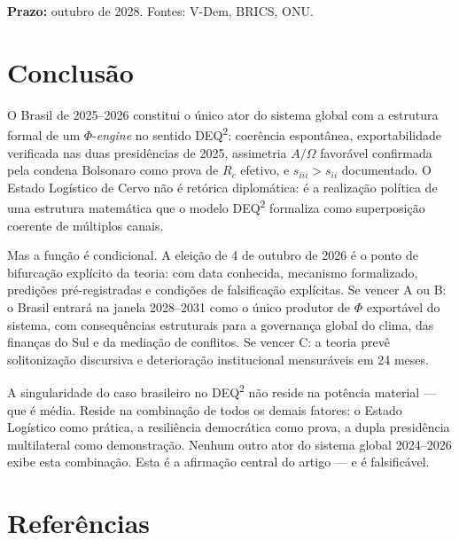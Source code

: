 \documentclass[12pt]{article}
\theoremstyle{definition}
\theoremstyle{remark}
\begin{document}
\textbf{Prazo:} outubro de 2028. Fontes: V-Dem, BRICS, ONU.

\section{Conclus\~{a}o}

O Brasil de 2025--2026 constitui o \'{u}nico ator do sistema global com a estrutura formal de um \(\Phi\)-\textit{engine} no sentido DEQ\textsuperscript{2}: coer\^{e}ncia espont\^{a}nea, exportabilidade verificada nas duas presi\-d\^{e}ncias de 2025, assimetria \(A/\Omega\) favor\'{a}vel confirmada pela condena Bolsonaro como prova de \(R_c\) efetivo, e \(s_{iii} > s_{ii}\) documentado. O Estado Log\'{i}stico de Cervo n\~{a}o \'{e} retórica diplom\'{a}tica: \'{e} a realiza\c{c}\~{a}o pol\'{i}tica de uma estrutura matem\'{a}tica que o modelo DEQ\textsuperscript{2} formaliza como superposi\c{c}\~{a}o coerente de m\'{u}ltiplos canais.

Mas a fun\c{c}\~{a}o \'{e} condicional. A elei\c{c}\~{a}o de 4 de outubro de 2026 \'{e} o ponto de bifurca\c{c}\~{a}o expl\'{i}cito da teoria: com data conhecida, mecanismo formalizado, predi\c{c}\~{o}es pr\'{e}-registradas e condi\c{c}\~{o}es de falsifica\c{c}\~{a}o expl\'{i}citas. Se vencer A ou B: o Brasil entrar\'{a} na janela 2028--2031 como o \'{u}nico produtor de \(\Phi\) export\'{a}vel do sistema, com consequ\^{e}ncias estruturais para a governan\c{c}a global do clima, das finan\c{c}as do Sul e da mediação de conflitos. Se vencer C: a teoria prevê solitoniza\c{c}\~{a}o discursiva e deteriora\c{c}\~{a}o institucional mensur\'{a}veis em 24 meses.

A singularidade do caso brasileiro no DEQ\textsuperscript{2} n\~{a}o reside na pot\^{e}ncia material --- que \'{e} m\'{e}dia. Reside na combina\c{c}\~{a}o de todos os demais fatores: o Estado Log\'{i}stico como pr\'{a}tica, a resili\^{e}ncia democr\'{a}tica como prova, a dupla presid\^{e}ncia multilateral como demonstra\c{c}\~{a}o. Nenhum outro ator do sistema global 2024--2026 exibe esta combina\c{c}\~{a}o. Esta \'{e} a afirma\c{c}\~{a}o central do artigo --- e \'{e} falsific\'{a}vel.

\section*{Refer\^{e}ncias}
\end{document}
